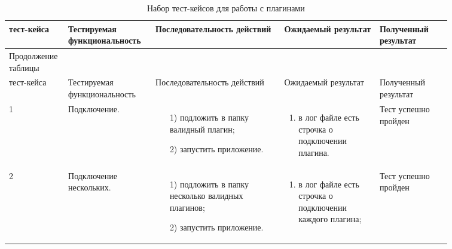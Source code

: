 \begin{longtable}{| >{\raggedright}m{0.06\linewidth} 
                  | >{\raggedright}m{0.18\linewidth} 
                  | >{\raggedright}m{0.27\linewidth} 
                  | >{\raggedright}m{0.2\linewidth} 
                  | >{\raggedright\arraybackslash}m{0.15\linewidth}|}
	\caption{Набор тест-кейсов для работы с плагинами}
	\label{table:testing:marketplace} \\

   \hline
   \No{} тест-кейса & Тестируемая функциональность & Последовательность действий & Ожидаемый результат & Полученный результат\\
   \endfirsthead

	\multicolumn{3}{@{} l}%
	{{Продолжение таблицы \thetable{}}} \\

	\hline
   	\No{} тест-кейса & Тестируемая функциональность & Последовательность действий & Ожидаемый результат & Полученный результат\\

	\hline 
	\endhead

	\hline
	1 & Подключение. & 
   			\begin{enumerate}
				\item[1)] подложить в папку \pluginFolder{} валидный плагин;
				\item[2)] запустить приложение.
			\end{enumerate}
   			& 
   			\begin{enumerate}
   				\item в лог файле есть строчка о подключении плагина.
   			\end{enumerate}
   			& Тест успешно пройден \\
	\hline
	2 & Подключение нескольких.  & 
   			\begin{enumerate}
				\item[1)] подложить в папку \pluginFolder{} несколько валидных плагинов;
				\item[2)] запустить приложение.
			\end{enumerate}
   			& 
   			\begin{enumerate}
   				\item в лог файле есть строчка о подключении каждого плагина;
   			\end{enumerate}
   			& Тест успешно пройден \\ 


\end{longtable}
